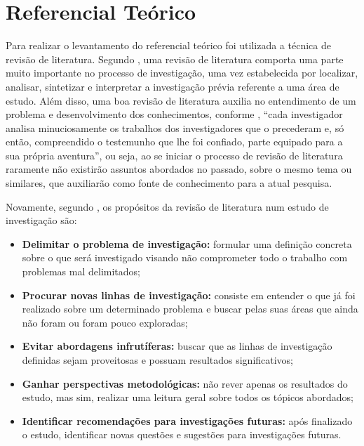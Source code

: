 \chapter{Referencial Teórico}

    Para realizar o levantamento do referencial teórico foi utilizada a técnica de revisão de literatura.
    Segundo , uma revisão de literatura comporta uma parte muito importante no processo de investigação, 
    uma vez estabelecida por localizar, analisar, sintetizar e interpretar a investigação prévia referente a uma área de estudo. 
    Além disso, uma boa revisão de literatura auxilia no entendimento de um problema e desenvolvimento dos conhecimentos, 
    conforme , “cada investigador analisa minuciosamente os trabalhos dos investigadores 
    que o precederam e, só então, compreendido o testemunho que lhe foi confiado, parte equipado para a sua própria aventura”, 
    ou seja, ao se iniciar o processo de revisão de literatura raramente não existirão assuntos abordados no passado, sobre o 
    mesmo tema ou similares, que auxiliarão como fonte de conhecimento para a atual pesquisa.

    Novamente, segundo , os propósitos da revisão de literatura num estudo de investigação são:

    \begin{itemize}

        \item \textbf{Delimitar o problema de investigação:} formular uma definição concreta sobre o que será investigado visando não comprometer todo o trabalho com problemas mal delimitados;
        \item \textbf{Procurar novas linhas de investigação:} consiste em entender o que já foi realizado sobre um determinado problema e buscar pelas suas áreas que ainda não foram ou foram pouco exploradas;
        \item \textbf{Evitar abordagens infrutíferas:} buscar que as linhas de investigação definidas sejam proveitosas e possuam resultados significativos;
        \item \textbf{Ganhar perspectivas metodológicas:} não rever apenas os resultados do estudo, mas sim, realizar uma leitura geral sobre todos os tópicos abordados;
        \item \textbf{Identificar recomendações para investigações futuras:} após finalizado o estudo, identificar novas questões e sugestões para investigações futuras.

    \end{itemize}

